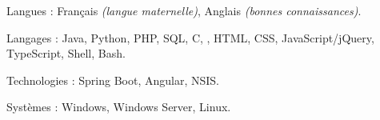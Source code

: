 \begin{indentsection}{\parindent}
\begin{description*}
  \item[Langues :]
  Français \emph{(langue maternelle)}, %
  Anglais \emph{(bonnes connaissances)}.
  \item[Langages :] Java, Python, PHP, SQL, C, \Csharp, HTML,
  CSS, JavaScript/jQuery, TypeScript, Shell, Bash.
  \item[Technologies :] Spring Boot, Angular, NSIS.
  \item[Systèmes :] Windows, Windows Server, Linux.
\end{description*}
\end{indentsection}
